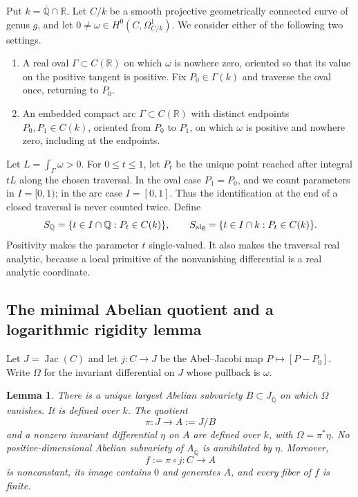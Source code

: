 \documentclass[11pt,a4paper]{article}
\newtheorem{lemma}[theorem]{Lemma}
\theoremstyle{definition}
\theoremstyle{remark}
\numberwithin{equation}{section}
\newcommand{\Qbar}{\overline{\mathbb Q}}
\begin{document}
Put $k=\Qbar\cap\mathbb R$.  Let $C/k$ be a smooth projective geometrically
connected curve of genus $g$, and let
$0\ne\omega\in H^0(C,\Omega^1_{C/k})$.  We consider either of the following
two settings.
\begin{enumerate}
\item A real oval $\Gamma\subset C(\mathbb R)$ on which $\omega$ is nowhere
zero, oriented so that its value on the positive tangent is positive.  Fix
$P_0\in\Gamma(k)$ and traverse the oval once, returning to $P_0$.
\item An embedded compact arc $\Gamma\subset C(\mathbb R)$ with distinct
endpoints $P_0,P_1\in C(k)$, oriented from $P_0$ to $P_1$, on which $\omega$
is positive and nowhere zero, including at the endpoints.
\end{enumerate}
Let $L=\int_\Gamma\omega>0$.  For $0\le t\le1$, let $P_t$ be the unique
point reached after integral $tL$ along the chosen traversal.  In the oval
case $P_1=P_0$, and we count parameters in $I=[0,1)$; in the arc case
$I=[0,1]$.  Thus the identification at the end of a closed traversal is
never counted twice.  Define
\begin{equation}\label{dd-sets}
 S_{\mathbb Q}=\{t\in I\cap\mathbb Q:P_t\in C(k)\},\qquad
 S_{\rm alg}=\{t\in I\cap k:P_t\in C(k)\}.
\end{equation}
Positivity makes the parameter $t$ single-valued.  It also makes the
traversal real analytic, because a local primitive of the nonvanishing
differential is a real analytic coordinate.

\subsection{The minimal Abelian quotient and a logarithmic rigidity lemma}

Let $J=\operatorname{Jac}(C)$ and let $j:C\to J$ be the Abel--Jacobi map
$P\mapsto[P-P_0]$.  Write $\Omega$ for the invariant differential on $J$
whose pullback is $\omega$.

\begin{lemma}\label{dd-minimal}
There is a unique largest Abelian subvariety $B\subset J_{\Qbar}$ on
which $\Omega$ vanishes.  It is defined over $k$.  The quotient
\[
 \pi:J\longrightarrow A:=J/B
\]
and a nonzero invariant differential $\eta$ on $A$ are defined over $k$,
with $\Omega=\pi^*\eta$.  No positive-dimensional Abelian subvariety of
$A_{\Qbar}$ is annihilated by $\eta$.  Moreover,
\[
 f:=\pi\circ j:C\longrightarrow A
\]
is nonconstant, its image contains $0$ and generates $A$, and every fiber
of $f$ is finite.
\end{lemma}
\end{document}
